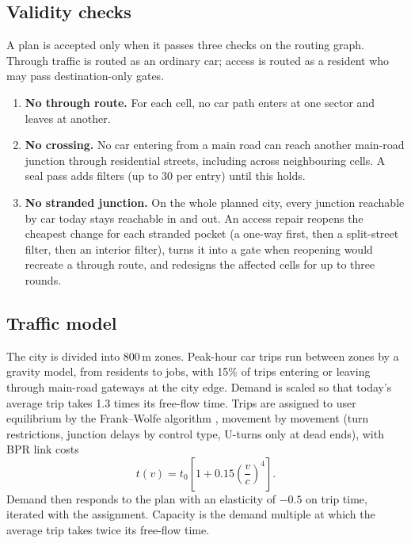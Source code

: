 \documentclass[11pt,a4paper]{article}
\begin{document}
\subsection{Validity checks}
A plan is accepted only when it passes three checks on the routing graph. Through traffic is routed as an ordinary car; access is routed as a resident who may pass destination-only gates.
\begin{enumerate}
  \item \textbf{No through route.} For each cell, no car path enters at one sector and leaves at another.
  \item \textbf{No crossing.} No car entering from a main road can reach another main-road junction through residential streets, including across neighbouring cells. A seal pass adds filters (up to 30 per entry) until this holds.
  \item \textbf{No stranded junction.} On the whole planned city, every junction reachable by car today stays reachable in and out. An access repair reopens the cheapest change for each stranded pocket (a one-way first, then a split-street filter, then an interior filter), turns it into a gate when reopening would recreate a through route, and redesigns the affected cells for up to three rounds.
\end{enumerate}

\subsection{Traffic model}
The city is divided into 800\,m zones. Peak-hour car trips run between zones by a gravity model, from residents to jobs, with 15\% of trips entering or leaving through main-road gateways at the city edge. Demand is scaled so that today's average trip takes 1.3 times its free-flow time. Trips are assigned to user equilibrium by the Frank--Wolfe algorithm \citep{frank1956}, movement by movement (turn restrictions, junction delays by control type, U-turns only at dead ends), with BPR link costs \citep{bpr1964}
\begin{equation}
  t(v) = t_0\left[1 + 0.15\left(\frac{v}{c}\right)^{4}\right].
\end{equation}
Demand then responds to the plan with an elasticity of $-0.5$ on trip time, iterated with the assignment. Capacity is the demand multiple at which the average trip takes twice its free-flow time.
\end{document}
